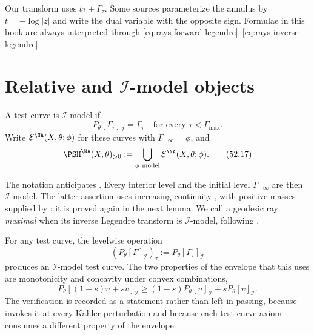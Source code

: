 \begin{remark}
\label{rem:rays-legendre-sign}
Our transform uses $t\tau+\Gamma_\tau$.  Some sources parameterize the
annulus by $t=-\log|z|$ and write the dual variable with the opposite
sign.  Formulae in this book are always interpreted through
\eqref{eq:rays-forward-legendre}--\eqref{eq:rays-inverse-legendre}.
\end{remark}

\section{Relative and \texorpdfstring{$\mathcal I$}{I}-model objects}
\label{sec:rays-ideal-model}

\begin{definition}
\label{def:rays-i-model-test}
A test curve is $\mathcal I$-model if
\[
                 P_\theta[\Gamma_\tau]_{\mathcal I}
                 =\Gamma_\tau
 \quad\text{for every }\tau<\Gamma_{\max}.
\tag{52.16}\label{eq:rays-i-model-level}
\]
Write
$\mathcal E^{\NA}(X,\theta;\phi)$ for these curves with
$\Gamma_{-\infty}=\phi$, and
\[
 \PSH^{\NA}(X,\theta)_{>0}
 :=\bigcup_{\phi\ {\rm model}}
      \mathcal E^{\NA}(X,\theta;\phi).
\tag{52.17}\label{eq:rays-positive-na-test-curves}
\]
\end{definition}

The notation anticipates .
Every interior level and the initial level $\Gamma_{-\infty}$ are then
$\mathcal I$-model.  The latter assertion uses increasing continuity
\cite[Proposition~3.2.13]{XiaBook}, with positive masses supplied by
; it is proved again in the next lemma.
We call a geodesic ray \emph{maximal} when its inverse Legendre transform
is $\mathcal I$-model, following \cite[Definition~9.3.3]{XiaBook}.

For any test curve, the levelwise operation
\[
 (P_\theta[\Gamma]_{\mathcal I})_\tau
 :=P_\theta[\Gamma_\tau]_{\mathcal I}
\tag{52.18}\label{eq:rays-test-i-envelope}
\]
produces an $\mathcal I$-model test curve.  The two properties of the
envelope that this uses are monotonicity and concavity under convex
combinations,
\[
 P_\theta[(1-s)u+sv]_{\mathcal I}
 \geq(1-s)P_\theta[u]_{\mathcal I}
       +sP_\theta[v]_{\mathcal I}.
\tag{52.19}\label{eq:rays-i-concavity}
\]
The verification is recorded as a statement rather than left in passing,
because  invokes it at every K\"ahler
perturbation and because each test-curve axiom consumes a different
property of the envelope.


